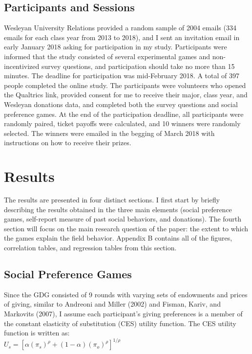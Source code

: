 \documentclass[12pt]{article}
\begin{document}
\subsection{Participants and Sessions}

Wesleyan University Relations provided a random sample of 2004 emails (334 emails for each class year from 2013 to 2018), and I sent an invitation email in early January 2018 asking for participation in my study. Participants were informed that the study consisted of several experimental games and non-incentivized survey questions, and participation should take no more than 15 minutes.  The deadline for participation was mid-February 2018. A total of 397 people completed the online study. The participants were volunteers who opened the Qualtrics link, provided consent for me to receive their major, class year, and Wesleyan donations data, and completed both the survey questions and social preference games. At the end of the participation deadline, all participants were randomly paired, ticket payoffs were calculated, and 10 winners were randomly selected. The winners were emailed  in the begging of March 2018 with instructions on how to receive their prizes.

\section{Results}
The results are presented in four distinct sections. I first start by briefly describing the results obtained in the three main elements (social preference games, self-report measure of past social behaviors, and donations). The fourth section will focus on the main research question of the paper: the extent to which the games explain the field behavior. Appendix B contains all of the figures, correlation tables, and regression tables from this section.

\subsection{Social Preference Games}
Since the GDG consisted of 9 rounds with varying sets of endowments and prices of giving, similar to Andreoni and Miller (2002) and Fisman, Kariv, and Markovits (2007), I assume each participant\rq s giving preferences is a member of the constant elasticity of substitution (CES) utility function.  The CES utility function is written as: \\

\(U_{s} = [\alpha(\pi_{s})^{\rho} + (1-\alpha)(\pi_{o})^{\rho}]^{1/\rho} \) \\
\end{document}
